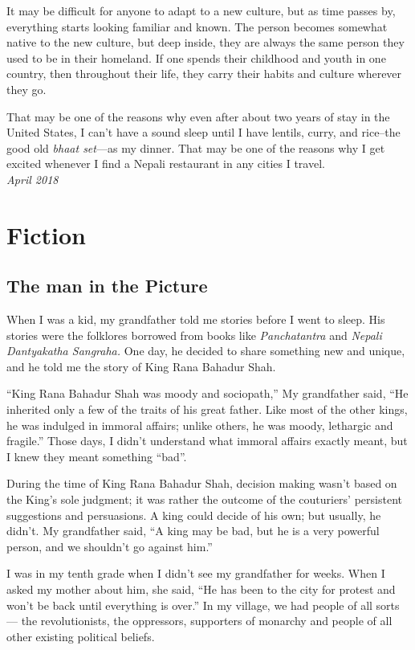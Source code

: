 \documentclass[oneside,12pt]{book}
\begin{document}
It may be difficult for anyone to adapt to a new culture, but as time passes by, everything starts looking familiar and known. The person becomes somewhat native to the new culture, but deep inside, they are always the same person they used to be in their homeland. If one spends their childhood and youth in one country, then throughout their life, they carry their habits and culture wherever they go.

That may be one of the reasons why even after about two years of stay in the United States, I can’t have a sound sleep until I have lentils, curry, and rice--the good old \textit{bhaat set}—as my dinner. That may be one of the reasons why I get excited whenever I find a Nepali restaurant in any cities I travel. \\

\textit{April 2018}

\chapter*{Fiction}
\section*{The man in the Picture}

When I was a kid, my grandfather told me stories before I went to sleep. His stories were the folklores borrowed from books like \textit{Panchatantra} and \textit{Nepali Dantyakatha Sangraha.} One day, he decided to share something new and unique, and he told me the story of King Rana Bahadur Shah. 

“King Rana Bahadur Shah was moody and sociopath,” My grandfather said, “He inherited only a few of the traits of his great father. Like most of the other kings, he was indulged in immoral affairs; unlike others, he was moody, lethargic and fragile.” Those days, I didn’t understand what immoral affairs exactly meant, but I knew they meant something “bad”. 

During the time of King Rana Bahadur Shah, decision making wasn’t based on the King’s sole judgment; it was rather the outcome of the couturiers’ persistent suggestions and persuasions. A king could decide of his own; but usually, he didn’t. My grandfather said, “A king may be bad, but he is a very powerful person, and we shouldn’t go against him.” 

I was in my tenth grade when I didn’t see my grandfather for weeks. When I asked my mother about him, she said, “He has been to the city for protest and won’t be back until everything is over.” In my village, we had people of all sorts — the revolutionists, the oppressors, supporters of monarchy and people of all other existing political beliefs. 
\end{document}
